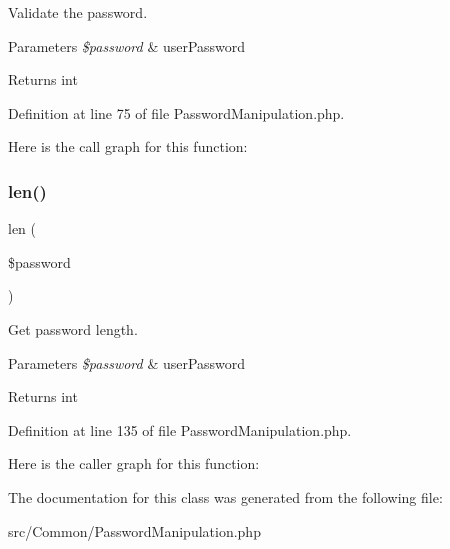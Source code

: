 Validate the password.


\begin{DoxyParams}{Parameters}
{\em \$password} & user\+Password\\
\hline
\end{DoxyParams}
\begin{DoxyReturn}{Returns}
int 
\end{DoxyReturn}


Definition at line 75 of file Password\+Manipulation.\+php.

Here is the call graph for this function\+:
\mbox{\label{class_zest_1_1_common_1_1_password_manipulation_a3fac569849d2f482ec1fbe9efbefb731}} 
\subsubsection{\texorpdfstring{len()}{len()}}
{\footnotesize\ttfamily len (\begin{DoxyParamCaption}\item[{}]{\$password }\end{DoxyParamCaption})}

Get password length.


\begin{DoxyParams}{Parameters}
{\em \$password} & user\+Password\\
\hline
\end{DoxyParams}
\begin{DoxyReturn}{Returns}
int 
\end{DoxyReturn}


Definition at line 135 of file Password\+Manipulation.\+php.

Here is the caller graph for this function\+:


The documentation for this class was generated from the following file\+:\begin{DoxyCompactItemize}
\item 
src/\+Common/Password\+Manipulation.\+php\end{DoxyCompactItemize}
